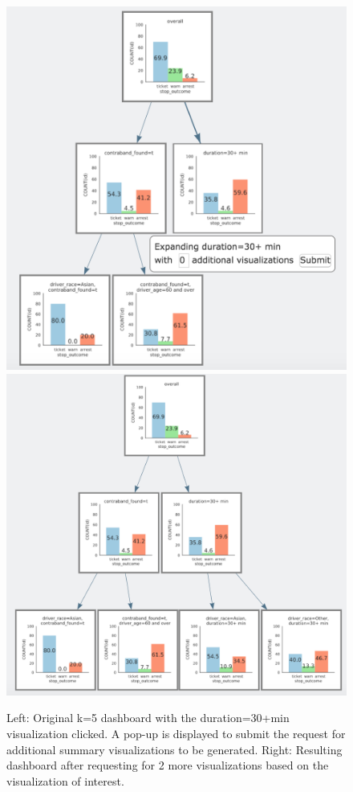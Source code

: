 \begin{figure}[ht!]
\centering
\includegraphics[width=0.43\linewidth]{figures/before_expansion2.png}
\includegraphics[width=0.49\linewidth]{figures/after_expansion3.png}
\caption{Left: Original k=5 dashboard with the duration=30+min visualization clicked. A pop-up is displayed to submit the request for additional summary visualizations to be generated. Right: Resulting dashboard after requesting for 2 more visualizations based on the visualization of interest.}
\label{fig:altroot_expansion}
\end{figure}
